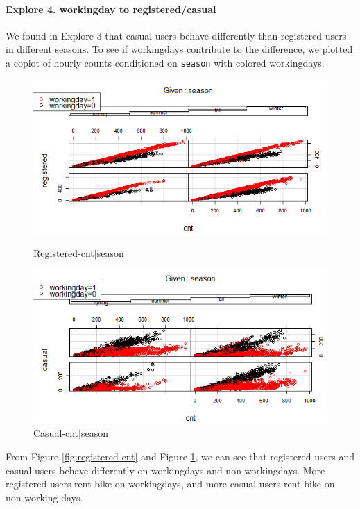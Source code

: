 \documentclass[12pt]{article}
\begin{document}
	\paragraph*{Explore 4. workingday to registered/casual}
	We found in Explore 3 that casual users behave differently than registered users in different seasons. To see if workingdays contribute to the difference, we plotted a coplot of hourly counts conditioned on \texttt{season} with colored workingdays.
	 \begin{figure}[H]
	 	\centering
	 	\begin{minipage}{.5\textwidth}
	 		\centering
	 		\includegraphics[width=\linewidth]{figures/registered_cnt_season.png}
	 		\caption{Registered-cnt$|$season}
	 		\label{fig:registered-cnt}
	 	\end{minipage}%
	 	\begin{minipage}{.5\textwidth}
	 		\centering
	 		\includegraphics[width=\linewidth]{figures/casual_cnt_season.png}
	 		\caption{Casual-cnt$|$season}
	 		\label{fig:casual-cnt}
	 	\end{minipage}
	 \end{figure}
	 From Figure \ref{fig:registered-cnt} and Figure \ref{fig:casual-cnt}, we can see that registered users and casual users behave differently on workingdays and non-workingdays. More registered users rent bike on workingdays, and more casual users rent bike on non-working days.
\end{document}
